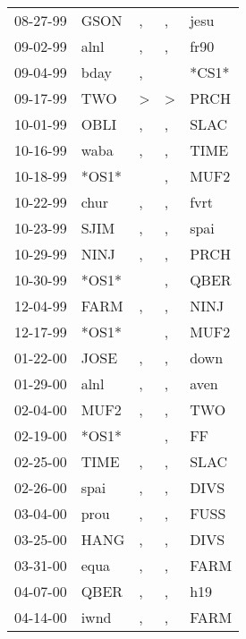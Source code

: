 \begin{supertabular}{lllll}
 08-27-99 &   GSON &                , &                , &   jesu \\
 09-02-99 &   alnl &                , &                , &   fr90 \\
 09-04-99 &   bday &                , &                  &  *CS1* \\
 09-17-99 &    TWO &     \textgreater &     \textgreater &   PRCH \\
 10-01-99 &   OBLI &                , &                , &   SLAC \\
 10-16-99 &   waba &                , &                , &   TIME \\
 10-18-99 &  *OS1* &                  &                , &   MUF2 \\
 10-22-99 &   chur &                , &                , &   fvrt \\
 10-23-99 &   SJIM &                , &                , &   spai \\
 10-29-99 &   NINJ &                , &                , &   PRCH \\
 10-30-99 &  *OS1* &                  &                , &   QBER \\
 12-04-99 &   FARM &                , &                , &   NINJ \\
 12-17-99 &  *OS1* &                  &                , &   MUF2 \\
 01-22-00 &   JOSE &                , &                , &   down \\
 01-29-00 &   alnl &                , &                , &   aven \\
 02-04-00 &   MUF2 &                , &                , &    TWO \\
 02-19-00 &  *OS1* &                  &                , &     FF \\
 02-25-00 &   TIME &                , &                , &   SLAC \\
 02-26-00 &   spai &                , &                , &   DIVS \\
 03-04-00 &   prou &                , &                , &   FUSS \\
 03-25-00 &   HANG &                , &                , &   DIVS \\
 03-31-00 &   equa &                , &                , &   FARM \\
 04-07-00 &   QBER &                , &                , &    h19 \\
 04-14-00 &   iwnd &                , &                , &   FARM \\

\end{supertabular}
